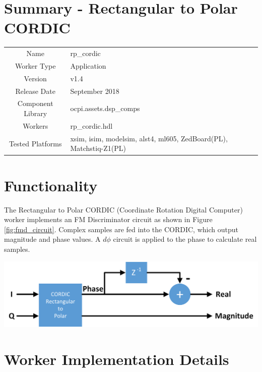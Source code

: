 \documentclass{article}
\author{} %
\date{Version \docVersion} %
\title{\docTitle}
\def\docVersion{1.4}
\def\comp{rp\_cordic}
\def\Comp{Rectangular to Polar CORDIC}
\begin{document}
\section*{Summary - \Comp}
\begin{tabular}{|c|M{13.5cm}|}
	\hline
	                  &                                                    \\
	\hline
	Name              & \comp                                              \\
	\hline
	Worker Type       & Application                                        \\
	\hline
	Version           & v\docVersion \\
	\hline
	Release Date      & September 2018 \\
	\hline
	Component Library & ocpi.assets.dsp\_comps                              \\
	\hline
	Workers           & \comp.hdl                                          \\
	\hline
	Tested Platforms  & xsim, isim, modelsim, alst4, ml605, ZedBoard(PL), Matchstiq-Z1(PL) \\
	\hline
\end{tabular}

\section*{Functionality}
\begin{flushleft}
	The Rectangular to Polar CORDIC (Coordinate Rotation Digital Computer) worker implements an FM Discriminator circuit as shown in Figure \ref{fig:fmd_circuit}. Complex samples are fed into the CORDIC, which output magnitude and phase values. A $d\phi$ circuit is applied to the phase to calculate real samples.
\end{flushleft}
{\centering\captionsetup{type=figure}\includegraphics[scale=0.8]{fmd_circuit}\par{}\label{fig:fmd_circuit}}

\section*{Worker Implementation Details}
\end{document}
